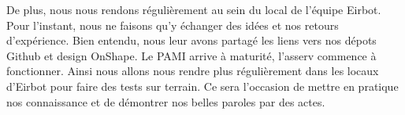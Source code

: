 \documentclass{article}
\begin{document}
De plus, nous nous rendons régulièrement au sein du local de l'équipe Eirbot. Pour l'instant, nous ne faisons qu'y échanger des idées et nos retours d'expérience. Bien entendu, nous leur avons partagé les liens vers nos dépots Github et design OnShape.
Le PAMI arrive à maturité, l'asserv commence à fonctionner. Ainsi nous allons nous rendre plus régulièrement dans les locaux d'Eirbot pour faire des tests sur terrain. Ce sera l'occasion de mettre en pratique nos connaissance et de démontrer nos belles paroles par des actes.
\end{document}
